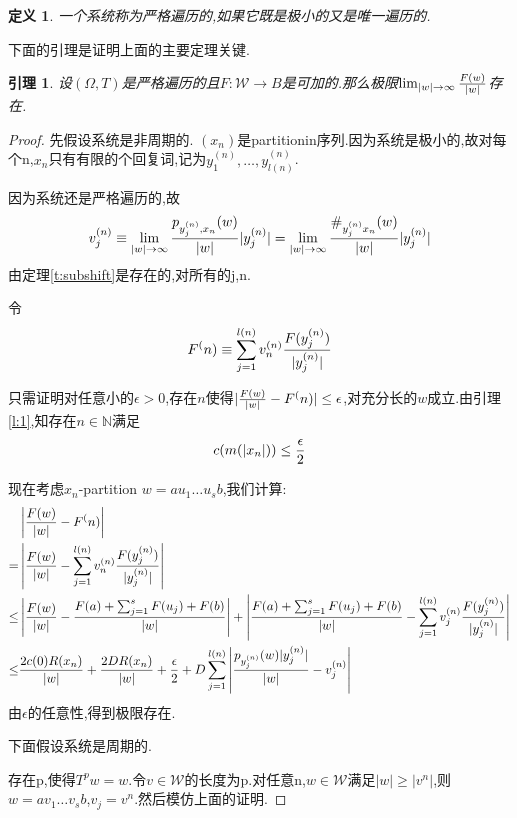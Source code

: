 \documentclass[a4paper,11pt,oneside]{book}
\newtheorem{lemma}{\textbf{\hspace{0.7cm}引理}}[section]
\newtheorem{definition}{\textbf{\hspace{0.7cm}定义}}[section]
\begin{document}
\begin{definition}
一个系统称为严格遍历的,如果它既是极小的又是唯一遍历的.
\end{definition}

下面的引理是证明上面的主要定理关键.

\begin{lemma}
\label{l:2}
设$(\Omega,T)$是严格遍历的且$F:\mathcal{W}\rightarrow B$是可加的.那么极限$\lim_{|w|\to \infty}{F(w)\over |w|}$存在.
\end{lemma}

\begin{proof}
先假设系统是非周期的.
$(x_n)$是partitionin序列.因为系统是极小的,故对每个n,$x_n$只有有限的个回复词,记为$y_1^{(n)},\ldots,y_{l(n)}^{(n)}$.

因为系统还是严格遍历的,故
$$v_j^{(n)}\equiv \lim_{|w|\to \infty}{p_{y_j^{(n)},x_n}(w)\over |w|}|y_j^{(n)}|=\lim_{|w|\to \infty}{\#_{y_j^{(n)}x_n}(w)\over |w|}|y_j^{(n)}|$$
由定理\ref{t:subshift}是存在的,对所有的j,n.

令$$F^(n)\equiv \sum_{j=1}^{l(n)}v_n^{(n)}{F(y_j^{(n)})\over |y_j^{(n)}|}$$

只需证明对任意小的$\epsilon>0$,存在$n$使得$|{F(w)\over |w|}-F^(n)|\leq \epsilon$,对充分长的$w$成立.由引理\ref{l:1},知存在$n\in\mathbb{N}$满足
$$c(m(|x_n|))\leq {\epsilon\over 2}$$

现在考虑$x_n$-partition $w=au_1\ldots u_sb$,我们计算:
\begin{align*}
&\left|{F(w)\over |w|}-F^(n)\right|\\
=&\left|{F(w)\over |w|}-\sum_{j=1}^{l(n)}v_n^{(n)}{F(y_j^{(n)})\over |y_j^{(n)}|}\right|\\
\leq & \left|{F(w)\over |w|}-{F(a)+\sum_{j=1}^sF(u_j)+F(b)\over |w|}\right|+\left|{F(a)+\sum_{j=1}^sF(u_j)+F(b)\over |w|}-\sum_{j=1}^{l(n)}v_j^{(n)}{F(y_j^{(n)})\over |y_j^{(n)}|}\right| \\
\leq &{2c(0)R(x_n)\over |w|}+{2DR(x_n)\over |w|}+{\epsilon\over 2}+D\sum_{j=1}^{l(n)}\left|{p_{y_j^{(n)}}(w)|y_j^{(n)}|\over |w|}-v_j^{(n)}\right|
\end{align*}
由$\epsilon$的任意性,得到极限存在.

下面假设系统是周期的.

存在p,使得$T^pw=w$.令$v\in \mathcal{W}$的长度为p.对任意n,$w\in\mathcal{W}$满足$|w|\geq |v^n|$,则$w=av_1\ldots v_sb$,$v_j=v^n$.然后模仿上面的证明.
\end{proof}
\end{document}
